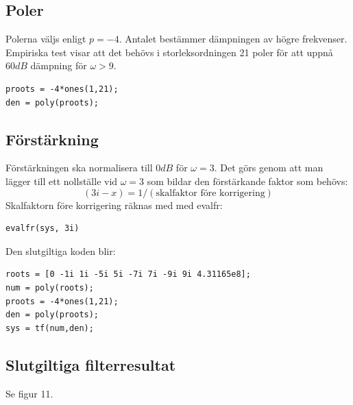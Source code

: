 \documentclass[]{article}
\begin{document}
\subsection{Poler} %
\label{sub:poler}
Polerna väljs enligt $p = -4$. Antalet bestämmer dämpningen av högre frekvenser. Empiriska test visar att det behövs i storleksordningen 21 poler för att uppnå $60dB$ dämpning för $\omega > 9$. \\
\begin{verbatim}
proots = -4*ones(1,21);
den = poly(proots);
\end{verbatim}
\subsection{Förstärkning} %
\label{sub:forstarkning}
Förstärkningen ska normalisera till $0dB$ för $\omega = 3$. Det görs genom att man lägger till ett nollställe vid $\omega = 3$ som bildar den förstärkande faktor som behövs: \\
\[
  (3i - x) = 1/(\text{skalfaktor före korrigering})
\]
Skalfaktorn före korrigering räknas med med evalfr: \\
\begin{verbatim}
evalfr(sys, 3i)
\end{verbatim}

Den slutgiltiga koden blir: \\

\begin{verbatim}
roots = [0 -1i 1i -5i 5i -7i 7i -9i 9i 4.31165e8];
num = poly(roots);
proots = -4*ones(1,21);
den = poly(proots);
sys = tf(num,den);
\end{verbatim}

\subsection{Slutgiltiga filterresultat} %
\label{sub:slutgiltiga_filterresultat}
Se figur 11.

\end{document}
